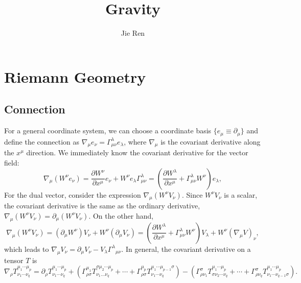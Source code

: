 \documentclass[aps,prb,superscriptaddress,nofootinbib]{revtex4}
\begin{document}
\title{Gravity}
\author{Jie Ren}


\maketitle


\tableofcontents

\section{Riemann Geometry}

\subsection{Connection}
For a general coordinate system, we can choose a coordinate basis $\{e_\mu \equiv \partial_\mu\}$ and define the connection as $\nabla_\mu e_\nu = \Gamma^\lambda_{\mu\nu} e_\lambda$, where $\nabla_\mu$ is the covariant derivative along the $x^\mu$ direction.
We immediately know the covariant derivative for the vector field:
\begin{equation*}
	\nabla_\mu (W^\nu e_\nu) = \frac{\partial W^\nu}{\partial x^\mu} e_\nu + W^\nu e_\lambda \Gamma^\lambda_{\mu\nu} = \left(\frac{\partial W^\lambda}{\partial x^\mu} +\Gamma^\lambda_{\mu\nu} W^\nu \right) e_\lambda,  
\end{equation*}
For the dual vector, consider the expression $\nabla_\mu (W^\nu V_\nu)$.
Since $W^\nu V_\nu$ is a scalar, the covariant derivative is the same as the ordinary derivative, $\nabla_\mu(W^\nu V_\nu) = \partial_\mu(W^\nu V_\nu)$.
On the other hand,
\begin{equation*}
	\nabla_\mu (W^\nu V_\nu) = (\partial_\mu W^\nu) V_\nu + W^\nu (\partial_\mu V_\nu)
	= \left(\frac{\partial W^\lambda}{\partial x^\mu} +\Gamma^\lambda_{\mu\nu} W^\nu \right)V_\lambda + W^\nu (\nabla_\mu V)_\nu,
\end{equation*}
which leads to $\nabla_\mu V_\nu = \partial_\mu V_\nu -V_\lambda {\Gamma^\lambda}_{\mu\nu}$.
In general, the covariant derivative on a tensor $T$ is
\begin{equation}
	\nabla_\rho T_{\nu_1 \cdots \nu_q}^{\mu_1 \cdots \mu_p}
	= \partial_\rho T_{\nu_1 \cdots \nu_q}^{\mu_1\cdots \mu_p}+
	(\Gamma^{\mu_1}_{\rho \sigma} T^{\sigma \mu_2 \cdots \mu_p}_{\nu_1 \ldots \nu_q}+\cdots+
	\Gamma^{\mu_p}_{\rho \sigma} T^{\mu_1 \cdots \mu_{p-1} \sigma}_{\nu_1 \cdots \nu_q}) - 
	(\Gamma^\sigma_{\rho \nu_1} T^{\mu_1 \cdots \mu_p}_{\sigma \nu_2 \cdots \nu_q}+\cdots+
	\Gamma^\sigma_{\rho \nu_q} T_{\nu_1 \cdots \nu_{q-1} \sigma}^{\mu_1 \cdots \mu_p}).
\end{equation}
\end{document}
